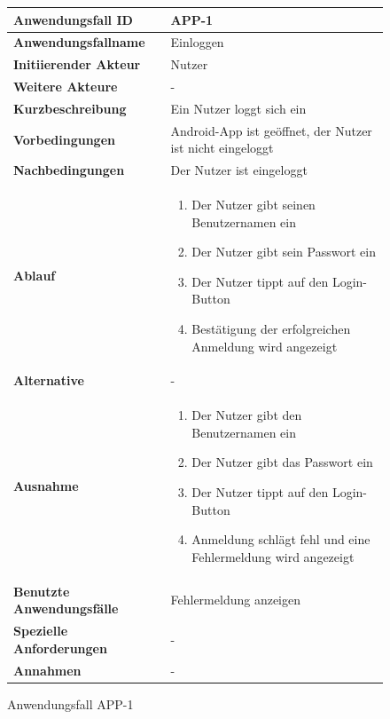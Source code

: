 \newpage

\begin{figure}[h]
	\centering
	\begin{tabularx}{\textwidth}{ X | X }
		\textbf{Anwendungsfall ID} & APP-1 \\ \hline
		\textbf{Anwendungsfallname} & Einloggen \\ \hline
		\textbf{Initiierender Akteur} & Nutzer \\ \hline
		\textbf{Weitere Akteure} & -  \\ \hline
		\textbf{Kurzbeschreibung} & Ein Nutzer loggt sich ein \\ \hline
		\textbf{Vorbedingungen} & Android-App ist geöffnet, der Nutzer ist nicht eingeloggt \\ \hline
		\textbf{Nachbedingungen} & Der Nutzer ist eingeloggt \\ \hline
		\textbf{Ablauf} &
			\begin{enumerate}
				\item Der Nutzer gibt seinen Benutzernamen ein
				\item Der Nutzer gibt sein Passwort ein
				\item Der Nutzer tippt auf den Login-Button
				\item Bestätigung der erfolgreichen Anmeldung wird angezeigt
			\end{enumerate} \\ \hline
		\textbf{Alternative} &
				- \\ \hline
		\textbf{Ausnahme} &
				\begin{enumerate}
					\item Der Nutzer gibt den Benutzernamen ein
					\item Der Nutzer gibt das Passwort ein
					\item Der Nutzer tippt auf den Login-Button
					\item Anmeldung schlägt fehl und eine Fehlermeldung wird angezeigt
				\end{enumerate}  \\ \hline
		\textbf{Benutzte Anwendungsfälle} & Fehlermeldung anzeigen \\ \hline
		\textbf{Spezielle Anforderungen} & - \\ \hline
		\textbf{Annahmen} & -
	\end{tabularx}
	\caption{Anwendungsfall APP-1}
	\label{fig:anwendungsfall-app-tabelle-APP-1}
\end{figure}

\newpage

